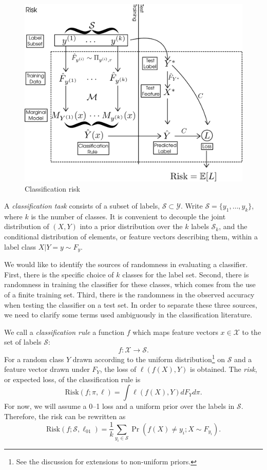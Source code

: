 \documentclass[12pt]{article}
\begin{document}
\begin{figure}[h]
\centering
\includegraphics[scale = 0.4]{extrapolation_figures/risk.png}
\caption{Classification risk}\label{fig:risk}
\end{figure}

A \emph{classification task} consists of a subset of labels,
$\mathcal{S} \subset \mathcal{Y}$. Write $\mathcal{S}=\{y_1,\hdots,
y_k\}$, where $k$ is the number of classes.  It is convenient to
decouple the joint distribution of $(X,Y)$ into a prior distribution
over the $k$ labels $\mathcal{S}_k$, and the conditional distribution
of elements, or feature vectors describing them, within a label class
$X|Y=y \sim F_y$.

We would like to identify the sources of randomness in evaluating a
classifier.  First, there is the specific choice of $k$ classes for
the label set. Second, there is randomness in training the classifier
for these classes, which comes from the use of a finite training
set. Third, there is the randomness in the observed accuracy when
testing the classifier on a test set. In order to separate these three
sources, we need to clarify some terms used ambiguously in the
classification literature.

We call a \emph{classification rule} a function $f$ which maps feature
vectors $x \in \mathcal{X}$ to the set of labels $\mathcal{S}$:
\[
f: \mathcal{X} \to \mathcal{S}.
\]
For a random class $Y$ drawn according to the uniform
distribution\footnote{See the discussion for extensions to non-uniform
priors.} on $\mathcal{S}$ and a feature vector drawn under $F_Y$, the
loss of $\ell(f(X),Y)$ is obtained.  The \emph{risk}, or expected
loss, of the classification rule is
\[\text{Risk}(f;\pi,\ell) = \int \ell(f(X),Y)dF_Y d\pi .\]
For now, we will assume a 0--1 loss and a uniform prior over the
labels in $\mathcal{S}$.  Therefore, the risk can be rewritten as
\[\text{Risk}(f;\mathcal{S}, \ell_{01}) = \frac{1}{k}\sum_{y_i\in \mathcal{S}}\Pr(f(X)\neq y_i ; X\sim F_{y_i} ).   \]
\end{document}
